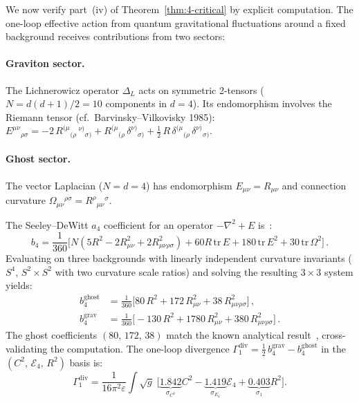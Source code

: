 We now verify part~(iv) of Theorem~\ref{thm:4-critical} by explicit computation. The one-loop effective action from quantum gravitational fluctuations around a fixed background receives contributions from two sectors:

\paragraph{Graviton sector.} The Lichnerowicz operator $\Delta_L$ acts on symmetric 2-tensors ($N = d(d{+}1)/2 = 10$ components in $d = 4$). Its endomorphism involves the Riemann tensor (cf.~Barvinsky--Vilkovisky 1985): $E^{\mu\nu}{}_{\rho\sigma} = -2\, R^{(\mu}{}_{(\rho}\,{}^{\nu)}{}_{\sigma)} + R^{(\mu}{}_{(\rho}\,\delta^{\nu)}{}_{\sigma)} + \tfrac{1}{2}\,R\,\delta^{(\mu}{}_{(\rho}\,\delta^{\nu)}{}_{\sigma)}$.

\paragraph{Ghost sector.} The vector Laplacian ($N = d = 4$) has endomorphism $E_{\mu\nu} = R_{\mu\nu}$ and connection curvature $\Omega_{\mu\nu}{}^{\rho\sigma} = R^{\rho}{}_{\mu\nu}{}^{\sigma}$.

The Seeley--DeWitt $a_4$ coefficient for an operator $-\nabla^2 + E$ is~\cite{ch4:Vassilevich2003}:
\begin{equation}
  b_4 = \frac{1}{360}\bigl[N(5R^2 - 2R_{\mu\nu}^2 + 2R_{\mu\nu\rho\sigma}^2) + 60R\,\mathrm{tr}\, E + 180\,\mathrm{tr}\, E^2 + 30\,\mathrm{tr}\,\Omega^2\bigr]\,.
  \label{eq:4-b4-general}
\end{equation}
Evaluating on three backgrounds with linearly independent curvature invariants ($S^4$, $S^2 \times S^2$ with two curvature scale ratios) and solving the resulting $3 \times 3$ system yields:
\begin{align}
  b_4^{\mathrm{ghost}} &= \frac{1}{360}\bigl[80\, R^2 + 172\, R_{\mu\nu}^2 + 38\, R_{\mu\nu\rho\sigma}^2\bigr]\,,
  \label{eq:4-b4-ghost} \\
  b_4^{\mathrm{grav}} &= \frac{1}{360}\bigl[-130\, R^2 + 1780\, R_{\mu\nu}^2 + 380\, R_{\mu\nu\rho\sigma}^2\bigr]\,.
  \label{eq:4-b4-grav}
\end{align}
The ghost coefficients $(80,\, 172,\, 38)$ match the known analytical result~\cite{ch4:AvramidiBarvinsky1985}, cross-validating the computation. The one-loop divergence $\Gamma_1^{\mathrm{div}} = \tfrac{1}{2}\, b_4^{\mathrm{grav}} - b_4^{\mathrm{ghost}}$ in the $(C^2,\, \mathcal{E}_4,\, R^2)$ basis is:
\begin{equation}
  \Gamma_1^{\mathrm{div}} = \frac{1}{16\pi^2 \varepsilon}\!\int\! \sqrt{g}\;
  \bigl[\underbrace{1.842}_{\sigma_{C^2}} C^2
  - \underbrace{1.419}_{\sigma_{E_4}} \mathcal{E}_4
  + \underbrace{0.403}_{\sigma_1} R^2\bigr].
  \label{eq:4-oneloop-r2}
\end{equation}

